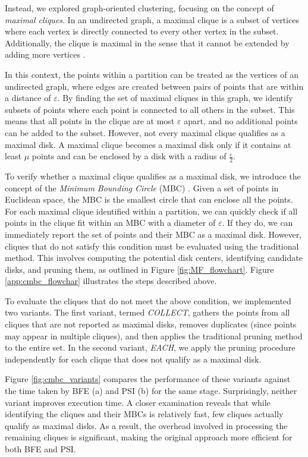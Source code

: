 Instead, we explored graph-oriented clustering, focusing on the concept of \textit{maximal cliques}. In an undirected graph, a maximal clique is a subset of 
vertices where each vertex is directly connected to every other vertex in the subset. Additionally, the clique is maximal in the sense that it cannot be 
extended by adding more vertices \cite{tomita_clique_2013, bron_algorithm_1973}.

In this context, the points within a partition can be treated as the vertices of an undirected graph, where edges are created between pairs of points that are 
within a distance of $\varepsilon$. By finding the set of maximal cliques in this graph, we identify subsets of points where each point is connected to all 
others in the subset. This means that all points in the clique are at most $\varepsilon$ apart, and no additional points can be added to the subset.
However, not every maximal clique qualifies as a maximal disk. A maximal clique becomes a maximal disk only if it contains at least $\mu$ points and can be 
enclosed by a disk with a radius of $\frac{\varepsilon}{2}$.

To verify whether a maximal clique qualifies as a maximal disk, we introduce the concept of the \textit{Minimum Bounding Circle} (MBC) \cite{welzl_mbc_1991}. 
Given a set of points in Euclidean space, the MBC is the smallest circle that can enclose all the points. For each maximal clique identified within a partition, 
we can quickly check if all points in the clique fit within an MBC with a diameter of $\varepsilon$. If they do, we can immediately report the set of points and 
their MBC as a maximal disk.  However, cliques that do not satisfy this condition must be evaluated using the traditional method. This involves computing the 
potential disk centers, identifying candidate disks, and pruning them, as outlined in Figure \ref{fig:MF_flowchart}. Figure \ref{app:cmbc_flowchar} illustrates the steps described above.

To evaluate the cliques that do not meet the above condition, we implemented two variants. The first variant, termed \textit{COLLECT}, gathers the points from 
all cliques that are not reported as maximal disks, removes duplicates (since points may appear in multiple cliques), and then applies the traditional pruning 
method to the entire set. In the second variant, \textit{EACH}, we apply the pruning procedure independently for each clique that does not qualify as a maximal 
disk.

Figure \ref{fig:cmbc_variants} compares the performance of these variants against the time taken by BFE (a) and PSI (b) for the same stage. Surprisingly, 
neither variant improves execution time. A closer examination reveals that while identifying the cliques and their MBCs is relatively fast, few cliques actually 
qualify as maximal disks. As a result, the overhead involved in processing the remaining cliques is significant, making the original approach more efficient for 
both BFE and PSI.

